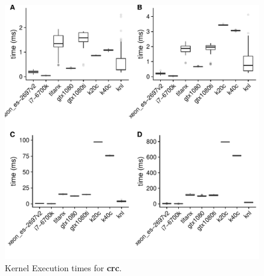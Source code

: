 \documentclass[../document.tex]{subfiles}
\begin{document}

%

\begin{figure}
\centering
\includegraphics[width=.5\textwidth]{figures/time-results/crc.pdf}
\caption{Kernel Execution times for {\bf crc}.}
\label{fig:time-crc}
\end{figure}
\end{document}
